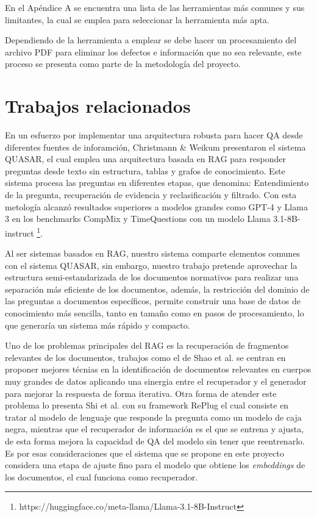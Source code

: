 En el Apéndice A se encuentra una lista de las herramientas más comunes y
sus limitantes, la cual se emplea para seleccionar la herramienta más apta.

Dependiendo de la herramienta a emplear se debe hacer un procesamiento del
archivo PDF para eliminar los defectos e información que no sea relevante,
este proceso se presenta como parte de la metodología del proyecto.

\section{Trabajos relacionados}

En un esfuerzo por implementar una arquitectura robusta para hacer QA
desde diferentes fuentes de inforamción, Christmann \& Weikum
\cite{christmann_rag-based_2024} presentaron el sistema QUASAR, el cual emplea una
arquitectura basada en RAG para responder preguntas desde texto sin estructura,
tablas y grafos de conocimiento. Este sistema procesa las preguntas en
diferentes etapas, que denomina: Entendimiento de la pregunta, recuperación
de evidencia y reclasificación y filtrado. Con esta metología alcanzó
resultados superiores a modelos grandes como GPT-4 y Llama 3 en los benchmarks
CompMix \cite{christmann_compmix_2024} y TimeQuestions \cite{jia_complex_2021}
con un modelo Llama 3.1-8B-instruct
\footnote{https://huggingface.co/meta-llama/Llama-3.1-8B-Instruct}.

Al ser sistemas basados en RAG, nuestro sistema comparte elementos comunes
con el sistema QUASAR, sin embargo, nuestro trabajo pretende aprovechar
la estructura semi-estandarizada de los documentos normativos para realizar
una separación más eficiente de los documentos, además, la restricción
del dominio de las preguntas a documentos específicos, permite construir
una base de datos de conocimiento más sencilla, tanto en tamaño como en
pasos de procesamiento, lo que generaría un sistema más rápido y compacto.

Uno de los problemas principales del RAG es la recuperación de fragmentos
relevantes de los documentos, trabajos como el de Shao et al. \cite{shao_enhancing_2023}
se centran en proponer mejores técnias en la identificación de
documentos relevantes en cuerpos muy grandes de datos aplicando una
sinergia entre el recuperador y el generador para mejorar la respuesta
de forma iterativa. Otra forma de atender este problema lo presenta
Shi et al. con su framework RePlug \cite{shi_replug_2024}
el cual consiste en tratar al modelo de lenguaje que responde la pregunta
como un modelo de caja negra, mientras que el recuperador de información
es el que se entrena y ajusta, de esta forma mejora la capacidad de
QA del modelo sin tener que reentrenarlo. Es por esas consideraciones
que el sistema que se propone en este proyecto considera una etapa de ajuste
fino para el modelo que obtiene los \textit{embeddings} de los documentos,
el cual funciona como recuperador.

